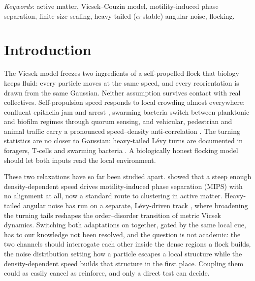 \documentclass[12pt]{iopart}
\begin{document}
\noindent\textit{Keywords}: active matter, Vicsek--Couzin model,
motility-induced phase separation, finite-size scaling, heavy-tailed
($\alpha$-stable) angular noise, flocking.

\maketitle

\section{Introduction}

The Vicsek model \citep{Vicsek1995} freezes two ingredients of
a self-propelled flock that biology keeps fluid: every particle
moves at the same speed, and every reorientation is drawn from
the same Gaussian. Neither assumption survives contact with
real collectives. Self-propulsion speed responds to local
crowding almost everywhere: confluent epithelia
jam and arrest \citep{Bi2016}, swarming bacteria switch between
planktonic and biofilm regimes through quorum sensing, and
vehicular, pedestrian and animal traffic carry a pronounced
speed--density anti-correlation \citep{Greenshields, LWR}. The
turning statistics are no closer to Gaussian: heavy-tailed
L\'evy turns are documented in foragers, T-cells and swarming
bacteria \citep{Reynolds2018, Harris2012, Ariel2015}. A
biologically honest flocking model should let both inputs read
the local environment.

These two relaxations have so far been studied apart.
\citet{CatesTailleur2015} showed that a steep enough
density-dependent speed drives motility-induced phase
separation (MIPS) with no alignment at all, now a standard route
to clustering in active matter. Heavy-tailed angular noise has
run on a separate, L\'evy-driven track \citep{Eliazar2003,
Ariel2015}, where broadening the turning tails reshapes the
order--disorder transition of metric Vicsek dynamics. Switching
both adaptations on together, gated by the same local cue, has
to our knowledge not been resolved, and the question is not
academic: the two channels should interrogate each other
inside the dense regions a flock builds, the noise
distribution setting how a particle escapes a local structure
while the density-dependent speed builds that structure in the
first place. Coupling them could as easily cancel as reinforce,
and only a direct test can decide.
\end{document}
